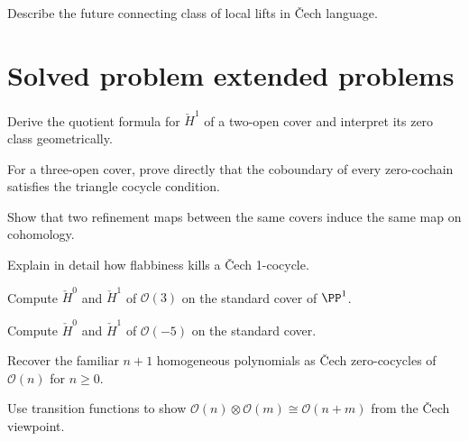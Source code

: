 \begin{exercise}\label{exr:vi47-24}
Describe the future connecting class of local lifts in \v{C}ech language.
\end{exercise}

\ifdefined\IncludeExerciseHints

\fi
\ifdefined\IncludeExerciseSolutions

\fi

\section{Solved problem extended problems}
\begin{problem}\label{prob:vi47-01}
Derive the quotient formula for $\check H^1$ of a two-open cover and interpret its zero class geometrically.
\end{problem}

\begin{problem}\label{prob:vi47-02}
For a three-open cover, prove directly that the coboundary of every zero-cochain satisfies the triangle cocycle condition.
\end{problem}

\begin{problem}\label{prob:vi47-03}
Show that two refinement maps between the same covers induce the same map on cohomology.
\end{problem}

\begin{problem}\label{prob:vi47-04}
Explain in detail how flabbiness kills a Čech 1-cocycle.
\end{problem}

\begin{problem}\label{prob:vi47-05}
Compute $\check H^0$ and $\check H^1$ of $\mathcal O(3)$ on the standard cover of $\PP^1$.
\end{problem}

\begin{problem}\label{prob:vi47-06}
Compute $\check H^0$ and $\check H^1$ of $\mathcal O(-5)$ on the standard cover.
\end{problem}

\begin{problem}\label{prob:vi47-07}
Recover the familiar $n+1$ homogeneous polynomials as Čech zero-cocycles of $\mathcal O(n)$ for $n\ge0$.
\end{problem}

\begin{problem}\label{prob:vi47-08}
Use transition functions to show $\mathcal O(n)\otimes\mathcal O(m)\cong\mathcal O(n+m)$ from the Čech viewpoint.
\end{problem}

